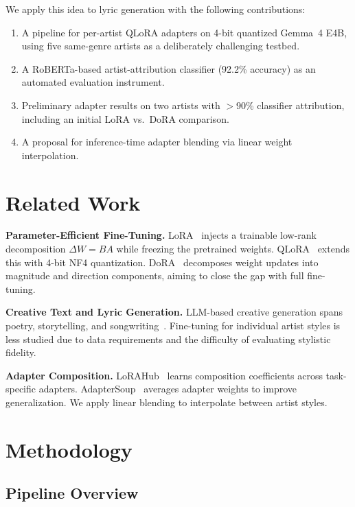 \documentclass[runningheads]{llncs}
\begin{document}
We apply this idea to lyric generation with the following contributions:
\begin{enumerate}
    \item A pipeline for per-artist QLoRA adapters on 4-bit quantized Gemma~4 E4B, using five same-genre artists as a deliberately challenging testbed.
    \item A RoBERTa-based artist-attribution classifier (92.2\% accuracy) as an automated evaluation instrument.
    \item Preliminary adapter results on two artists with $>$90\% classifier attribution, including an initial LoRA vs.\ DoRA comparison.
    \item A proposal for inference-time adapter blending via linear weight interpolation.
\end{enumerate}

\section{Related Work}
\label{sec:related}

\textbf{Parameter-Efficient Fine-Tuning.}
LoRA~\cite{hu2022lora} injects a trainable low-rank decomposition $\Delta W = BA$ while freezing the pretrained weights. QLoRA~\cite{dettmers2023qlora} extends this with 4-bit NF4 quantization. DoRA~\cite{liu2024dora} decomposes weight updates into magnitude and direction components, aiming to close the gap with full fine-tuning.

\textbf{Creative Text and Lyric Generation.}
LLM-based creative generation spans poetry, storytelling, and songwriting~\cite{vonrutte2023language}. Fine-tuning for individual artist styles is less studied due to data requirements and the difficulty of evaluating stylistic fidelity.

\textbf{Adapter Composition.}
LoRAHub~\cite{zhang2023lorahub} learns composition coefficients across task-specific adapters. AdapterSoup~\cite{chronopoulou2023adaptersoup} averages adapter weights to improve generalization. We apply linear blending to interpolate between artist styles.

\section{Methodology}
\label{sec:method}

\subsection{Pipeline Overview}
\end{document}
